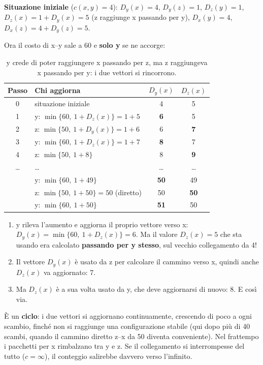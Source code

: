 \textbf{Situazione iniziale} ($c(x,y) = 4$): $D_y(x) = 4$, $D_y(z) = 1$, $D_z(y) = 1$, $D_z(x) = 1 + D_y(x) = 5$ (z raggiunge x
passando per y), $D_x(y) = 4$, $D_x(z) = 4 + D_y(z) = 5$.

Ora il costo di x--y sale a 60 e \textbf{solo y} se ne accorge:

\begin{table}[H]
\centering
\begin{tabular}{clcc}
\toprule
\textbf{Passo} & \textbf{Chi aggiorna} & $D_y(x)$ & $D_z(x)$ \\
\midrule
0 & situazione iniziale & 4 & 5 \\
1 & y: $\min\{60,\ 1 + D_z(x)\} = 1 + 5$ & \textbf{6} & 5 \\
2 & z: $\min\{50,\ 1 + D_y(x)\} = 1 + 6$ & 6 & \textbf{7} \\
3 & y: $\min\{60,\ 1 + D_z(x)\} = 1 + 7$ & \textbf{8} & 7 \\
4 & z: $\min\{50,\ 1 + 8\}$ & 8 & \textbf{9} \\
\dots & \dots & \dots & \dots \\
& y: $\min\{60,\ 1 + 49\}$ & \textbf{50} & 49 \\
& z: $\min\{50,\ 1 + 50\} = 50$ (diretto) & 50 & \textbf{50} \\
& y: $\min\{60,\ 1 + 50\}$ & \textbf{51} & 50 \\
\bottomrule
\end{tabular}
\caption{y crede di poter raggiungere x passando per z, ma z raggiungeva x passando per y: i due vettori si rincorrono.}
\end{table}

\begin{enumerate}
    \item y rileva l'aumento e aggiorna il proprio vettore verso x: $D_y(x) = \min\{60,\ 1 + D_z(x)\} = 6$. Ma il valore $D_z(x) = 5$
          che sta usando era calcolato \textbf{passando per y stesso}, sul vecchio collegamento da 4!
    \item Il vettore $D_y(x)$ è usato da z per calcolare il cammino verso x, quindi anche $D_z(x)$ va aggiornato: 7.
    \item Ma $D_z(x)$ è a sua volta usato da y, che deve aggiornarsi di nuovo: 8. E così via.
\end{enumerate}

È un \textbf{ciclo}: i due vettori si aggiornano continuamente, crescendo di poco a ogni scambio, finché non si raggiunge una
configurazione stabile (qui dopo più di 40 scambi, quando il cammino diretto z--x da 50 diventa conveniente). Nel frattempo i
pacchetti per x rimbalzano tra y e z. Se il collegamento si interrompesse del tutto ($c = \infty$), il conteggio salirebbe
davvero verso l'infinito.

